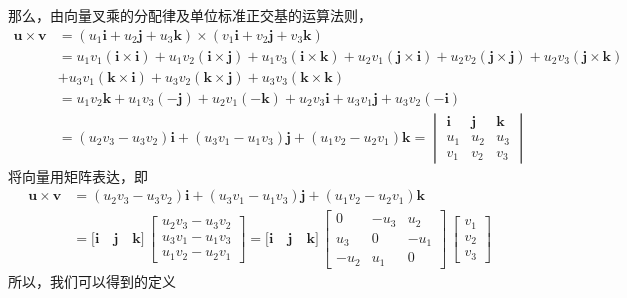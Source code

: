 那么，由向量叉乘的分配律及单位标准正交基的运算法则，
\vspace*{-0.5em}
\begin{align*}
	\bm{u} \times \bm{v} &= (u_1\bm{i} +u_2\bm{j} +u_3\bm{k}) \times (v_1\bm{i} + v_2\bm{j} + v_3 \bm{k}) \\
	&= u_1v_1( \bm{i} \times \bm{i}) + u_1v_2 (\bm{i} \times \bm{j}) + u_1v_3 (\bm{i} \times \bm{k} ) 
	+ u_2v_1 (\bm{j} \times \bm{i}) + u_2v_2 (\bm{j} \times \bm{j}) + u_2v_3 (\bm{j} \times \bm{k}) \\
	&+ u_3v_1 (\bm{k} \times \bm{i}) + u_3v_2 (\bm{k} \times \bm{j}) + u_3v_3 (\bm{k} \times \bm{k}) \\
	&= u_1v_2 \bm{k} + u_1v_3 (-\bm{j} )+ u_2v_1 (- \bm{k}) + u_2v_3 \bm{i} + u_3v_1 \bm{j} + u_3v_2 (-\bm{i}) \\
	&= (u_2v_3 - u_3v_2)\bm{i} + (u_3v_1 - u_1v_3) \bm{j} + (u_1v_2 - u_2v_1)\bm{k} =
	\begin{vmatrix}
		\bm{i} & \bm{j} & \bm{k} \\
		u_1 & u_2 & u_3 \\
		v_1& v_2 & v_3
	\end{vmatrix}
\end{align*}
将向量用矩阵表达，即
\begin{align*}
	\bm{u} \times \bm{v} &= (u_2v_3 - u_3v_2)\bm{i} + (u_3v_1 - u_1v_3) \bm{j} + (u_1v_2 - u_2v_1)\bm{k} \\
	& = 
	\big[ \bm{i} \quad \bm{j} \quad \bm{k} \big] \,
	\begin{bmatrix}
		u_2v_3 - u_3v_2 \\
		u_3v_1 - u_1v_3 \\
		u_1v_2 - u_2v_1
	\end{bmatrix} 
	=
	\big[ \bm{i} \quad \bm{j} \quad \bm{k} \big] \,
	\begin{bmatrix}
		0 & -u_3 & u_2 \\
		u_3 & 0 & -u_1 \\
		-u_2  &  u_1 & 0
	\end{bmatrix}
	\, 
	\begin{bmatrix}
		v_1 \\
		v_2 \\
		v_3 
	\end{bmatrix}
\end{align*}
所以，我们可以得到的定义

